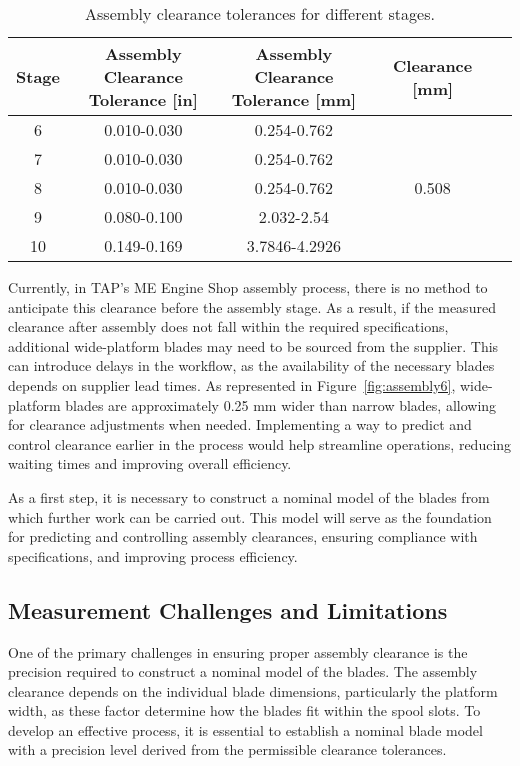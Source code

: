 \begin{table}[h]
    \centering
    \begin{tabular}{ccccc}
        \toprule
        Stage & \makecell{Assembly Clearance \\ Tolerance [in]} & \makecell{Assembly Clearance \\ Tolerance [mm]} & Clearance [mm]\\
        \midrule
        6  & 0.010-0.030 & 0.254-0.762  &  \\
        7  & 0.010-0.030 & 0.254-0.762  &  \\
        8  & 0.010-0.030 & 0.254-0.762  & 0.508 \\
        9  & 0.080-0.100 & 2.032-2.54   &   \\
        10 & 0.149-0.169 & 3.7846-4.2926 &  \\
        \midrule
    \end{tabular}
    \caption{Assembly clearance tolerances for different stages.}
    \label{tab:clearance_tolerance}
\end{table}

Currently, in \gls{TAP}'s \gls{ME} Engine Shop assembly process, there is no method to anticipate this clearance before the assembly stage. As a result, if the measured clearance after assembly does not fall within the required specifications, additional wide-platform blades may need to be sourced from the supplier. This can introduce delays in the workflow, as the availability of the necessary blades depends on supplier lead times. As represented in Figure~\ref{fig:assembly6}, wide-platform blades are approximately 0.25 mm wider than narrow blades, allowing for clearance adjustments when needed. Implementing a way to predict and control clearance earlier in the process would help streamline operations, reducing waiting times and improving overall efficiency.

As a first step, it is necessary to construct a nominal model of the blades from which further work can be carried out. This model will serve as the foundation for predicting and controlling assembly clearances, ensuring compliance with specifications, and improving process efficiency.

\subsection{Measurement Challenges and Limitations}
\label{subsec:desafios}

One of the primary challenges in ensuring proper assembly clearance is the precision required to construct a nominal model of the blades. The assembly clearance depends on the individual blade dimensions, particularly the platform width, as these factor determine how the blades fit within the spool slots. To develop an effective process, it is essential to establish a nominal blade model with a precision level derived from the permissible clearance tolerances.

